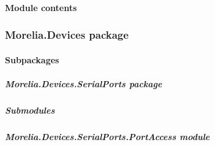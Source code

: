 \documentclass[letterpaper,10pt,english]{sphinxmanual}
\begin{document}
\paragraph{Module contents}
\label{\detokenize{Morelia.Commands:module-Morelia.Commands}}\label{\detokenize{Morelia.Commands:module-contents}}
\sphinxstepscope


\subsubsection{Morelia.Devices package}
\label{\detokenize{Morelia.Devices:morelia-devices-package}}\label{\detokenize{Morelia.Devices::doc}}

\paragraph{Subpackages}
\label{\detokenize{Morelia.Devices:subpackages}}
\sphinxstepscope


\subparagraph{Morelia.Devices.SerialPorts package}
\label{\detokenize{Morelia.Devices.SerialPorts:morelia-devices-serialports-package}}\label{\detokenize{Morelia.Devices.SerialPorts::doc}}

\subparagraph{Submodules}
\label{\detokenize{Morelia.Devices.SerialPorts:submodules}}

\subparagraph{Morelia.Devices.SerialPorts.PortAccess module}
\label{\detokenize{Morelia.Devices.SerialPorts:module-Morelia.Devices.SerialPorts.PortAccess}}\label{\detokenize{Morelia.Devices.SerialPorts:morelia-devices-serialports-portaccess-module}}
\end{document}
